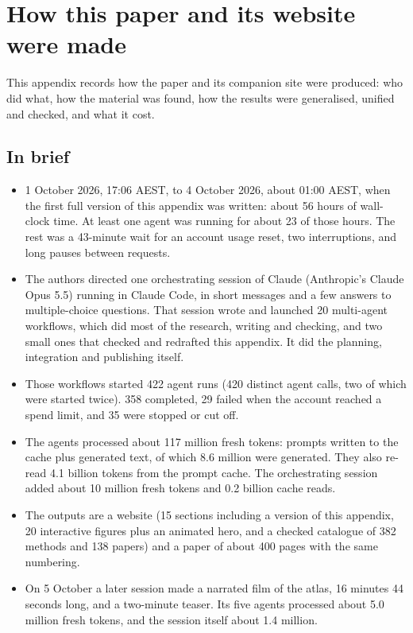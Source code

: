 \section{How this paper and its website were made}\label{app:making-of}

This appendix records how the paper and its companion site were produced: who did what, how the material was found, how the results were generalised, unified and checked, and what it cost.

\subsection{In brief}

\begin{itemize}
\item 1 October 2026, 17:06 AEST, to 4 October 2026, about 01:00 AEST, when the first full version of this appendix was written: about 56 hours of wall-clock time. At least one agent was running for about 23 of those hours. The rest was a 43-minute wait for an account usage reset, two interruptions, and long pauses between requests.
\item The authors directed one orchestrating session of Claude (Anthropic's Claude Opus 5.5) running in Claude Code, in short messages and a few answers to multiple-choice questions. That session wrote and launched 20 multi-agent workflows, which did most of the research, writing and checking, and two small ones that checked and redrafted this appendix. It did the planning, integration and publishing itself.
\item Those workflows started 422 agent runs (420 distinct agent calls, two of which were started twice). 358 completed, 29 failed when the account reached a spend limit, and 35 were stopped or cut off.
\item The agents processed about 117 million fresh tokens: prompts written to the cache plus generated text, of which 8.6 million were generated. They also re-read 4.1 billion tokens from the prompt cache. The orchestrating session added about 10 million fresh tokens and 0.2 billion cache reads.
\item The outputs are a website (15 sections including a version of this appendix, 20 interactive figures plus an animated hero, and a checked catalogue of 382 methods and 138 papers) and a paper of about 400 pages with the same numbering.
\item On 5 October a later session made a narrated film of the atlas, 16 minutes 44 seconds long, and a two-minute teaser. Its five agents processed about 5.0 million fresh tokens, and the session itself about 1.4 million.
\end{itemize}

